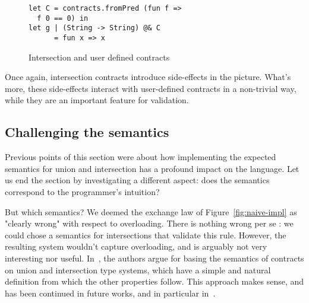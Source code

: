 \documentclass[sigplan,10pt,review,anonymous]{acmart}
\newcommand{\unsure}[2][1=]{}
\newcommand{\nickel}[1]{\lstinline[language=nickel]{#1}}
\begin{document}
\begin{figure}[h]
\begin{lstlisting}[language=nickel]
let C = contracts.fromPred (fun f =>
  f 0 == 0) in
let g | (String -> String) @& C
      = fun x => x
\end{lstlisting}
\caption{Intersection and user defined contracts}
\label{fig:inter-flat-contracts}
\end{figure}

Once again, intersection contracts introduce side-effects in the picture. What's
more, these side-effects interact with user-defined contracts in a non-trivial
way, while they are an important feature for validation.
\unsure{(Yann) Should we talk about thiemann here, who do support user-defined
contracts?}


\subsection{Challenging the semantics}


Previous points of this section were about how implementing the expected
semantics for union and intersection has a profound impact on the language. Let
us end the section by investigating a different aspect: does the
semantics correspond to the programmer's intuition?

But which semantics? We deemed the exchange law of Figure~\ref{fig:naive-impl}
as "clearly wrong" with respect to overloading. There is nothing wrong per se :
we could chose a semantics for intersections that validate this rule.  However,
the resulting system wouldn't capture overloading, and is arguably not very
interesting nor useful. In~\cite{KeilThiemannUnionIntersection}, the authors
argue for basing the semantics of contracts on union and intersection type
systems, which have a simple and natural definition from which the other
properties follow. This approach makes sense, and has been continued in future
works, and in particular in~\cite{RootCauseOfBlame}.
\end{document}
